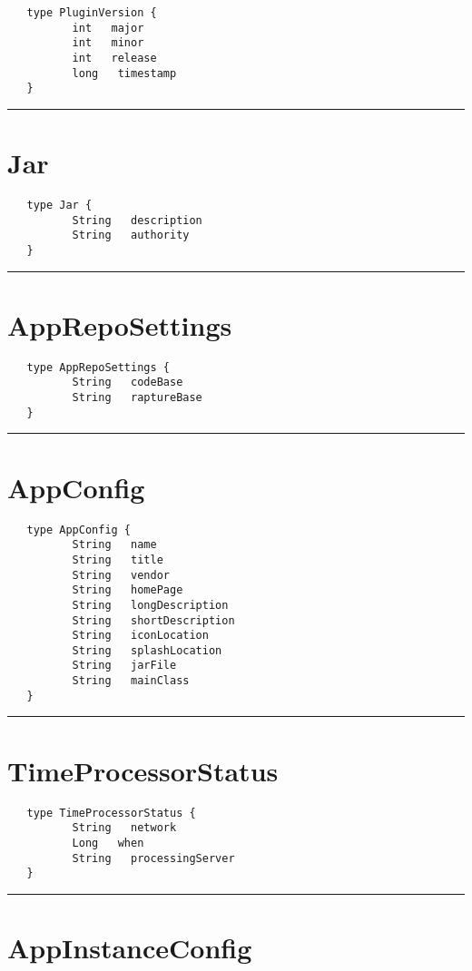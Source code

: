 \begin{verbatim}
   type PluginVersion {
          int   major
          int   minor
          int   release
          long   timestamp
   }
\end{verbatim}

\rule{15cm}{2pt}
\section{Jar}
\label{type:Jar}

\begin{verbatim}
   type Jar {
          String   description
          String   authority
   }
\end{verbatim}

\rule{15cm}{2pt}
\section{AppRepoSettings}
\label{type:AppRepoSettings}

\begin{verbatim}
   type AppRepoSettings {
          String   codeBase
          String   raptureBase
   }
\end{verbatim}

\rule{15cm}{2pt}
\section{AppConfig}
\label{type:AppConfig}

\begin{verbatim}
   type AppConfig {
          String   name
          String   title
          String   vendor
          String   homePage
          String   longDescription
          String   shortDescription
          String   iconLocation
          String   splashLocation
          String   jarFile
          String   mainClass
   }
\end{verbatim}

\rule{15cm}{2pt}
\section{TimeProcessorStatus}
\label{type:TimeProcessorStatus}

\begin{verbatim}
   type TimeProcessorStatus {
          String   network
          Long   when
          String   processingServer
   }
\end{verbatim}

\rule{15cm}{2pt}
\section{AppInstanceConfig}
\label{type:AppInstanceConfig}

